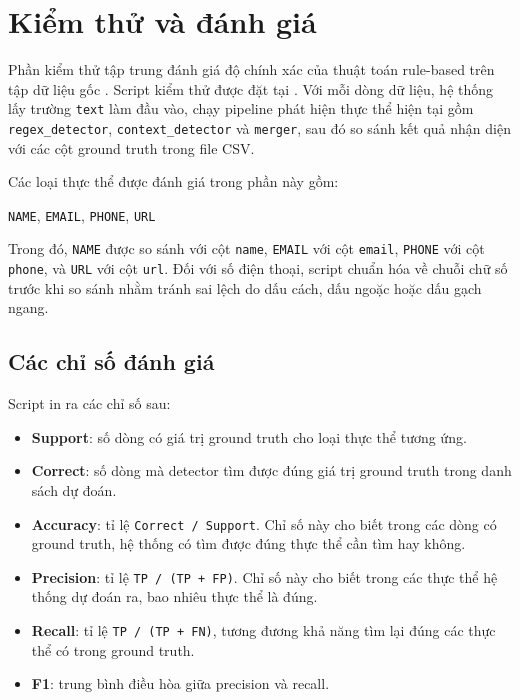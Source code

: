 \section{Kiểm thử và đánh giá}

Phần kiểm thử tập trung đánh giá độ chính xác của thuật toán rule-based trên
tập dữ liệu gốc . Script kiểm thử được đặt tại
. Với mỗi dòng dữ liệu, hệ thống
lấy trường \texttt{text} làm đầu vào, chạy pipeline phát hiện thực thể hiện tại
gồm \texttt{regex\_detector}, \texttt{context\_detector} và \texttt{merger}, sau
đó so sánh kết quả nhận diện với các cột ground truth trong file CSV.

Các loại thực thể được đánh giá trong phần này gồm:

\begin{center}
    \texttt{NAME}, \texttt{EMAIL}, \texttt{PHONE}, \texttt{URL}
\end{center}

Trong đó, \texttt{NAME} được so sánh với cột \texttt{name}, \texttt{EMAIL} với
cột \texttt{email}, \texttt{PHONE} với cột \texttt{phone}, và \texttt{URL} với
cột \texttt{url}. Đối với số điện thoại, script chuẩn hóa về chuỗi chữ số trước
khi so sánh nhằm tránh sai lệch do dấu cách, dấu ngoặc hoặc dấu gạch ngang.

\subsection{Các chỉ số đánh giá}

Script in ra các chỉ số sau:

\begin{itemize}[nosep]
    \item \textbf{Support}: số dòng có giá trị ground truth cho loại thực thể
          tương ứng.
    \item \textbf{Correct}: số dòng mà detector tìm được đúng giá trị ground
          truth trong danh sách dự đoán.
    \item \textbf{Accuracy}: tỉ lệ \texttt{Correct / Support}. Chỉ số này cho
          biết trong các dòng có ground truth, hệ thống có tìm được đúng thực
          thể cần tìm hay không.
    \item \textbf{Precision}: tỉ lệ \texttt{TP / (TP + FP)}. Chỉ số này cho
          biết trong các thực thể hệ thống dự đoán ra, bao nhiêu thực thể là
          đúng.
    \item \textbf{Recall}: tỉ lệ \texttt{TP / (TP + FN)}, tương đương khả năng
          tìm lại đúng các thực thể có trong ground truth.
    \item \textbf{F1}: trung bình điều hòa giữa precision và recall.
\end{itemize}

